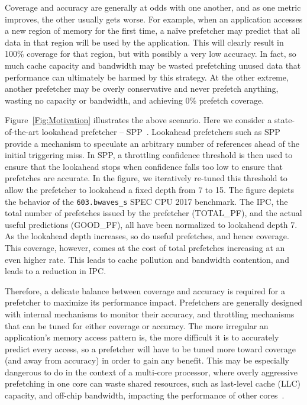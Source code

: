 Coverage and accuracy are generally at odds with one another, and as
one metric improves, the other usually gets worse. For example, when
an application accesses a new region of memory for the first time, a
na\"ive prefetcher may predict that all data in that region will be
used by the application.  This will clearly result in 100\% coverage
for that region, but with possibly a very low accuracy.  In fact, so
much cache capacity and bandwidth may be wasted prefetching unused
data that performance can ultimately be harmed by this strategy. At
the other extreme, another prefetcher may be overly conservative and
never prefetch anything, wasting no capacity or bandwidth, and
achieving 0\% prefetch coverage.

Figure~\ref{Fig:Motivation} illustrates the above scenario.  Here we
consider a state-of-the-art lookahead prefetcher -- SPP~\cite{SPP}.
Lookahead prefetchers such as SPP provide a mechanism to speculate an
arbitrary number of references ahead of the initial triggering miss.
In SPP, a throttling confidence threshold is then used to ensure that
the lookahead stops when confidence falls too low to ensure that
prefetches are accurate.  In the figure, we iteratively re-tuned 
this threshold to allow the prefetcher to lookahead a fixed
depth from 7 to 15. The figure depicts the behavior 
of the {\tt 603.bwaves\_s} SPEC CPU 2017 benchmark. The IPC, the 
total number of prefetches issued by the prefetcher (TOTAL\_PF), 
and the actual useful predictions (GOOD\_PF), all have been normalized 
to lookahead depth 7. As the lookahead
depth increases, so do useful prefetches, and hence coverage. This
coverage, however, comes at the cost of total prefetches increasing at
an even higher rate. This leads to cache pollution and bandwidth
contention, and leads to a reduction in IPC.  

Therefore, a delicate balance between coverage and accuracy is
required for a prefetcher to maximize its performance impact.
Prefetchers are generally designed with internal mechanisms to monitor
their accuracy, and throttling mechanisms that can be tuned for either
coverage or accuracy.  The more irregular an application's memory
access pattern is, the more difficult it is to accurately predict
every access, so a prefetcher will have to be tuned more toward
coverage (and away from accuracy) in order to gain any benefit. This
may be especially dangerous to do in the context of a multi-core
processor, where overly aggressive prefetching in one core can waste
shared resources, such as last-level cache (LLC) capacity, and
off-chip bandwidth, impacting the performance of other
cores~\cite{Friendly}.

